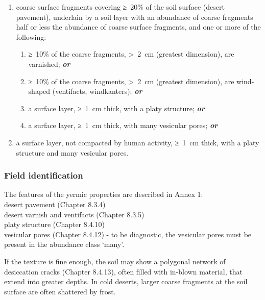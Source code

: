 \documentclass[
  letterpaper,
  DIV=11,
  numbers=noendperiod]{scrreprt}
\providecommand{\tightlist}{%
  \setlength{\itemsep}{0pt}\setlength{\parskip}{0pt}}\usepackage{longtable,booktabs,array}
\begin{document}
\begin{enumerate}
\def\labelenumi{\arabic{enumi}.}
\tightlist
\item
  coarse surface fragments covering ≥~20\% of the soil surface (desert
  pavement), underlain by a soil layer with an abundance of coarse
  fragments half or less the abundance of coarse surface fragments, and
  one or more of the following:

  \begin{enumerate}
  \def\labelenumii{\alph{enumii}.}
  \tightlist
  \item
    ≥~10\% of the coarse fragments, \textgreater~2~cm (greatest
    dimension), are varnished; \textbf{\emph{or}}
  \item
    ≥~10\% of the coarse fragments, \textgreater~2~cm (greatest
    dimension), are wind-shaped (ventifacts, windkanters);
    \textbf{\emph{or}}
  \item
    a surface layer, ≥~1~cm thick, with a platy structure;
    \textbf{\emph{or}}
  \item
    a surface layer, ≥~1~cm thick, with many vesicular pores;
    \textbf{\emph{or}}
  \end{enumerate}
\item
  a surface layer, not compacted by human activity, ≥~1~cm thick, with a
  platy structure and many vesicular pores.
\end{enumerate}

\hypertarget{field-identification-40}{%
\subsubsection{Field identification}\label{field-identification-40}}

The features of the yermic properties are described in Annex 1:\\
desert pavement (Chapter 8.3.4)\\
desert varnish and ventifacts (Chapter 8.3.5)\\
platy structure (Chapter 8.4.10)\\
vesicular pores (Chapter 8.4.12) - to be diagnostic, the vesicular pores
must be present in the abundance class `many'.

If the texture is fine enough, the soil may show a polygonal network of
desiccation cracks (Chapter 8.4.13), often filled with in-blown
material, that extend into greater depths. In cold deserts, larger
coarse fragments at the soil surface are often shattered by frost.
\end{document}
